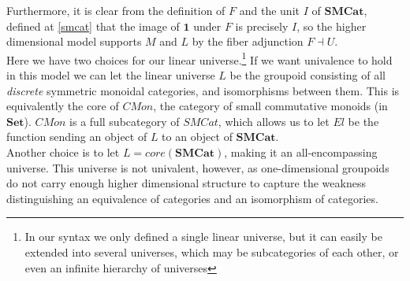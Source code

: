   Furthermore, it is clear from the definition of $F$ and the unit $I$ of $\mathbf{SMCat}$, defined at \ref{smcat} that the image of $\mathbf{1}$ under $F$ is precisely $I$, so the higher dimensional model supports $M$ and $L$ by the fiber adjunction $F \dashv U$. \\
  Here we have two choices for our linear universe.\footnote{In our syntax we only defined a single linear universe, but it can easily be extended into several universes, which may be subcategories of each other, or even an infinite hierarchy of universes}
  If we want univalence to hold in this model we can let the linear universe $L$ be the groupoid consisting of all \textit{discrete} symmetric monoidal categories, and isomorphisms between them. This is equivalently the core of $CMon$, the category of small commutative monoids (in $\mathbf{Set}$). $CMon$ is a full subcategory of $SMCat$, which allows us to let $El$ be the function sending an object of $L$ to an object of $\mathbf{SMCat}$.\\
  Another choice is to let $L = core(\mathbf{SMCat})$, making it an all-encompassing universe. This universe is not univalent, however, as one-dimensional groupoids do not carry enough higher dimensional structure to capture the weakness distinguishing an equivalence of categories and an isomorphism of categories.  
